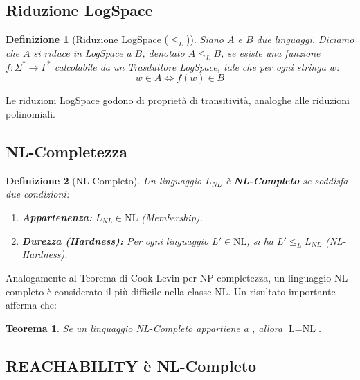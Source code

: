 \documentclass[a4paper]{article}
\newtheorem{theorem}{Teorema}[section]
\newtheorem{definition}{Definizione}[section]
\begin{document}
\subsection{Riduzione LogSpace}

\begin{definition}[Riduzione LogSpace ($\le_L$)]
Siano $A$ e $B$ due linguaggi. Diciamo che $A$ si riduce in LogSpace a $B$, denotato $A \le_L B$, se esiste una funzione $f: \Sigma^* \to \Gamma^*$ calcolabile da un Trasduttore LogSpace, tale che per ogni stringa $w$:
\[ w \in A \iff f(w) \in B \]
\end{definition}
Le riduzioni LogSpace godono di proprietà di transitività, analoghe alle riduzioni polinomiali.

\subsection{NL-Completezza}

\begin{definition}[NL-Completo]
Un linguaggio $L_{NL}$ è \textbf{NL-Completo} se soddisfa due condizioni:
\begin{enumerate}
    \item \textbf{Appartenenza:} $L_{NL} \in \text{NL}$ (Membership).
    \item \textbf{Durezza (Hardness):} Per ogni linguaggio $L' \in \text{NL}$, si ha $L' \le_L L_{NL}$ (NL-Hardness).
\end{enumerate}
\end{definition}
Analogamente al Teorema di Cook-Levin per NP-completezza, un linguaggio NL-completo è considerato il più difficile nella classe NL. Un risultato importante afferma che:
\begin{theorem}
Se un linguaggio NL-Completo appartiene a , allora $\text{L} = \text{NL}$.
\end{theorem}

\subsection{REACHABILITY è NL-Completo}
\end{document}
